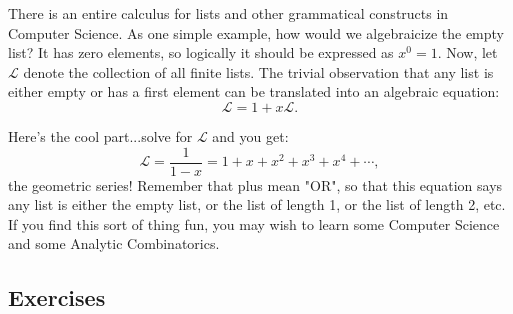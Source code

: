 \documentclass[twoside,openright,titlepage,a4paper]{book}
\begin{document}
\begin{sloppypar}
There is an entire calculus for lists and other grammatical constructs in Computer Science. As one simple example, how would we algebraicize the empty list? It has zero elements, so logically it should be expressed as $x^0 = 1$. Now, let $\mathcal{L}$ denote the collection of all finite lists. The trivial observation that any list is either empty or has a first element can be translated into an algebraic equation: 
\[ \mathcal{L} = 1 + x \mathcal{L}. \]

Here's the cool part...solve for $\mathcal{L}$ and you get:
\[ \mathcal{L} = \frac{1}{1-x} = 1 + x + x^2 + x^3 + x^4 + \dotsb, \]
the geometric series! Remember that plus mean "OR", so that this equation says any list is either the empty list, or the list of length 1, or the list of length 2, etc. If you find this sort of thing fun, you may wish to learn some Computer Science and some Analytic Combinatorics.

\subsection{Exercises}


\end{sloppypar}
\end{document}
